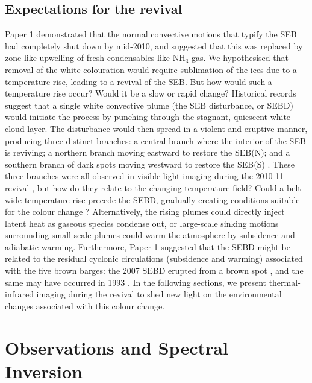 \documentclass[final,authoryear,5p,times,twocolumn]{elsarticle}
\begin{document}
\subsection{Expectations for the revival}
Paper 1 demonstrated that the normal convective motions that typify the SEB had completely shut down by mid-2010, and suggested that this was replaced by zone-like upwelling of fresh condensables like NH$_3$ gas.  We hypothesised that removal of the white colouration would require sublimation of the ices due to a temperature rise, leading to a revival of the SEB.  But how would such a temperature rise occur? Would it be a slow or rapid change?  Historical records \citep{95rogers, 96sanchez} suggest that a single white convective plume (the SEB disturbance, or SEBD) would initiate the process by punching through the stagnant, quiescent white cloud layer.  The disturbance would then spread in a violent and eruptive manner, producing three distinct branches:  a central branch where the interior of the SEB is reviving; a northern branch moving eastward to restore the SEB(N); and a southern branch of dark spots moving westward to restore the SEB(S) \citep{95rogers}.  These three branches were all observed in visible-light imaging during the 2010-11 revival \citep{11rogers_21, 16rogers}, but how do they relate to the changing temperature field?  Could a belt-wide temperature rise precede the SEBD, gradually creating conditions suitable for the colour change \citep{81orton, 94satoh}?  Alternatively, the rising plumes could directly inject latent heat as gaseous species condense out, or large-scale sinking motions surrounding small-scale plumes could warm the atmosphere by subsidence and adiabatic warming.  Furthermore, Paper 1 suggested that the SEBD might be related to the residual cyclonic circulations (subsidence and warming) associated with the five brown barges:  the 2007 SEBD erupted from a brown spot \citep{07rogers}, and the same may have occurred in 1993 \citep{96sanchez}.  In the following sections, we present thermal-infrared imaging during the revival to shed new light on the environmental changes associated with this colour change.

\section{Observations and Spectral Inversion}
\label{obs}
\end{document}
